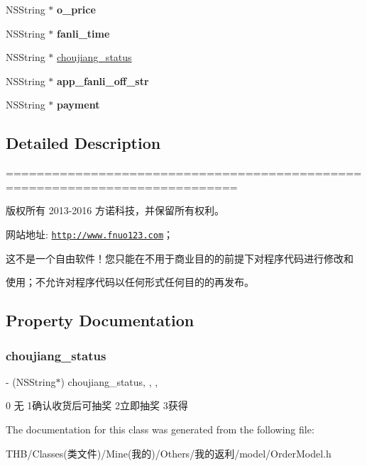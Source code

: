 \begin{DoxyCompactItemize}
\mbox{\label{interface_order_model_a6842d282c9d56a4266c0a56205265dfd}} 
N\+S\+String $\ast$ {\bfseries o\+\_\+price}
\item 
\mbox{\label{interface_order_model_a4d7787b1e4812eb85b848d9b0581cc0d}} 
N\+S\+String $\ast$ {\bfseries fanli\+\_\+time}
\item 
N\+S\+String $\ast$ \mbox{\hyperlink{interface_order_model_a994a768ef4e9c65f25efb51f5baeb8ab}{choujiang\+\_\+status}}
\item 
\mbox{\label{interface_order_model_a2b4a2039a4c7cfcca20b49fef16cd40f}} 
N\+S\+String $\ast$ {\bfseries app\+\_\+fanli\+\_\+off\+\_\+str}
\item 
\mbox{\label{interface_order_model_a9ec7189ffbfa97c42a2c7b5d5342f63b}} 
N\+S\+String $\ast$ {\bfseries payment}
\end{DoxyCompactItemize}


\subsection{Detailed Description}
============================================================================

版权所有 2013-\/2016 方诺科技，并保留所有权利。

网站地址\+: \href{http://www.fnuo123.com}{\tt http\+://www.\+fnuo123.\+com}； 



这不是一个自由软件！您只能在不用于商业目的的前提下对程序代码进行修改和

使用；不允许对程序代码以任何形式任何目的的再发布。 

 

\subsection{Property Documentation}
\mbox{\label{interface_order_model_a994a768ef4e9c65f25efb51f5baeb8ab}} 
\subsubsection{\texorpdfstring{choujiang\+\_\+status}{choujiang\_status}}
{\footnotesize\ttfamily -\/ (N\+S\+String$\ast$) choujiang\+\_\+status\hspace{0.3cm}{\ttfamily [read]}, {\ttfamily [write]}, {\ttfamily [nonatomic]}, {\ttfamily [copy]}}

0 无 1确认收货后可抽奖 2立即抽奖 3获得 

The documentation for this class was generated from the following file\+:\begin{DoxyCompactItemize}
\item 
T\+H\+B/\+Classes(类文件)/\+Mine(我的)/\+Others/我的返利/model/Order\+Model.\+h\end{DoxyCompactItemize}

